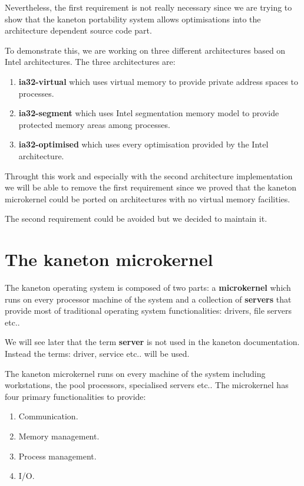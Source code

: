 \begin{multicols}{2}
Nevertheless, the first requirement is not really necessary since we are
trying to show that the kaneton portability system allows optimisations
into the architecture dependent source code part.

To demonstrate this, we are working on three different architectures based
on Intel architectures. The three architectures are:

\begin{enumerate}
  \item
    \textbf{ia32-virtual} which uses virtual memory to provide private
    address spaces to processes.
  \item
    \textbf{ia32-segment} which uses Intel segmentation memory model to
    provide protected memory areas among processes.
  \item
    \textbf{ia32-optimised} which uses every optimisation provided
    by the Intel architecture.
\end{enumerate}

Throught this work and especially with the second architecture implementation
we will be able to remove the first requirement since we proved that the
kaneton microkernel could be ported on architectures with no virtual memory
facilities.

The second requirement could be avoided but we decided to maintain it.

%
%

\section{The kaneton microkernel}

The kaneton operating system is composed of two parts: a \textbf{microkernel}
which runs on every processor machine of the system and a collection of
\textbf{servers} that provide most of traditional operating system
functionalities: drivers, file servers etc..

We will see later that the term \textbf{server} is not used in the kaneton
documentation. Instead the terms: driver, service etc.. will be used.

The kaneton microkernel runs on every machine of the system including
workstations, the pool processors, specialised servers etc.. The microkernel
has four primary functionalities to provide:

\begin{enumerate}
  \item
    Communication.
  \item
    Memory management.
  \item
    Process management.
  \item
    I/O.
\end{enumerate}


\end{multicols}
